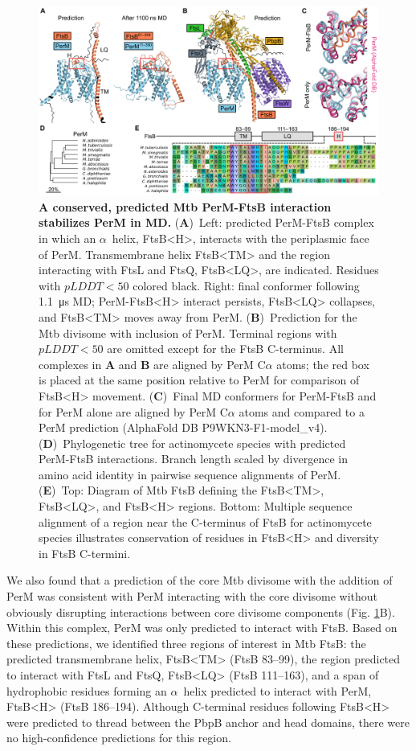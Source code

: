 \documentclass[twocolumn,pdflatex,sn-nature]{sn-jnl}%
\def\textsuperscript#1{<#1>}%
\newcommand\mtb{Mtb}
\newcommand\ftsbTM{FtsB\textsuperscript{TM}}
\newcommand\ftsbLQ{FtsB\textsuperscript{LQ}}
\newcommand\ftsbH{FtsB\textsuperscript{H}}
\begin{document}
\begin{figure}[htb]
\centering
\includegraphics[width=1.0\textwidth]{../figures/fig1_1.png}
\caption{
    \textbf{A conserved, predicted \mtb{} PerM-FtsB interaction stabilizes PerM in MD.}
    (\textbf{A})~Left: predicted PerM-FtsB complex in which an $\alpha$~helix, \ftsbH{}, interacts with the periplasmic face of PerM. Transmembrane helix \ftsbTM{} and the region interacting with FtsL and FtsQ, \ftsbLQ{}, are indicated. Residues with $pLDDT < 50$ colored black. Right: final conformer following \qty{1.1}{\us} MD; PerM-\ftsbH{} interact persists, \ftsbLQ{} collapses, and \ftsbTM{} moves away from PerM.
    (\textbf{B})~Prediction for the \mtb{} divisome with inclusion of PerM. Terminal regions with $pLDDT < 50$ are omitted except for the FtsB C-terminus. All complexes in \textbf{A} and \textbf{B} are aligned by PerM C$\alpha$ atoms; the red box is placed at the same position relative to PerM for comparison of \ftsbH{} movement.
    (\textbf{C})~Final MD conformers for PerM-FtsB and for PerM alone are aligned by PerM C$\alpha$ atoms and compared to a PerM prediction  (AlphaFold DB P9WKN3-F1-model{\_}v4).
    (\textbf{D})~Phylogenetic tree for actinomycete species with predicted PerM-FtsB interactions. Branch length scaled by divergence in amino acid identity in pairwise sequence alignments of PerM.
    (\textbf{E})~Top: Diagram of \mtb{} FtsB defining the \ftsbTM{}, \ftsbLQ{}, and \ftsbH{} regions. Bottom: Multiple sequence alignment of a region near the C-terminus of FtsB for actinomycete species illustrates conservation of residues in \ftsbH{} and diversity in FtsB C-termini.
}\label{fig1_1}
\end{figure}

We also found that a prediction of the core \mtb{} divisome with the addition of PerM was consistent with PerM interacting with the core divisome without obviously disrupting interactions between core divisome components (Fig. \ref{fig1_1}B).
Within this complex, PerM was only predicted to interact with FtsB.
Based on these predictions, we identified three regions of interest in \mtb{} FtsB: the predicted transmembrane helix, \ftsbTM{} (FtsB 83--99), the region predicted to interact with FtsL and FtsQ, \ftsbLQ{} (FtsB 111--163), and a span of hydrophobic residues forming an $\alpha$~helix predicted to interact with PerM, \ftsbH{} (FtsB 186--194).
Although C-terminal residues following \ftsbH{} were predicted to thread between the PbpB anchor and head domains, there were no high-confidence predictions for this region.
\end{document}
